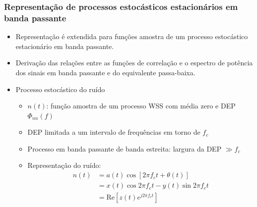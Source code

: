 \begin{frame}
	\frametitle{Representação de processos estocásticos estacionários em banda passante}

	\begin{itemize}
	  \item Representação é extendida para funções amostra de um processo estocástico estacionário em banda passante.
	  \item Derivação das relações entre as funções de correlação e o espectro de potência dos sinais em banda passante e do equivalente passa-baixa.
	  \item Processo estocástico do ruído
	  \begin{itemize}
	   \item $n(t)$: função amostra de um processo WSS com média zero e DEP $\Phi_{nn}(f)$
	   \item DEP limitada a um intervalo de frequências em torno de $f_c$
	   \item Processo em banda passante de banda estreita: largura da DEP $\gg f_c$
	   \item Representação do ruído:
	   \begin{align*}
		n(t) &= a(t)\cos[2\pi f_c t + \theta(t)] \\
		&= x(t)\cos 2\pi f_c t - y(t) \sin 2\pi f_c t \\
		&= \mathrm{Re}[z(t)e^{j2\pi f_c t}]
	   \end{align*}

	  \end{itemize}

	\end{itemize}

\end{frame}

